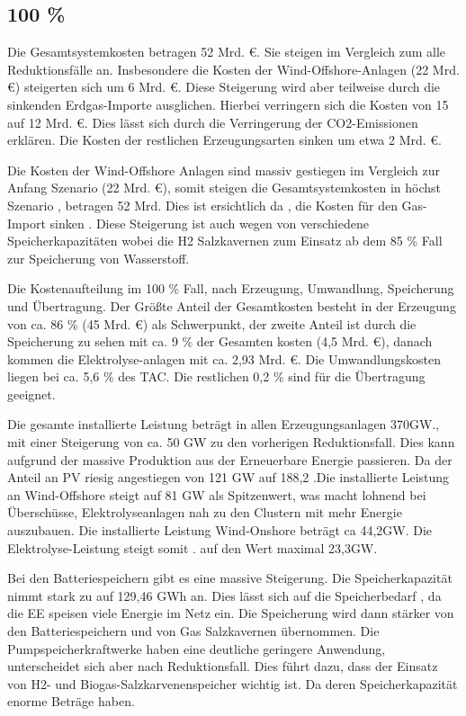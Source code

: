 \subsection{100 \%}
%
Die Gesamtsystemkosten betragen 52 Mrd. €. Sie steigen im Vergleich zum alle Reduktionsfälle an. Insbesondere die Kosten der Wind-Offshore-Anlagen (22 Mrd. €) steigerten sich um 6 Mrd. €. Diese Steigerung wird aber teilweise durch die sinkenden Erdgas-Importe ausglichen. Hierbei verringern sich die Kosten von 15 auf 12 Mrd. €. Dies lässt sich durch die Verringerung der CO2-Emissionen erklären. Die Kosten der restlichen Erzeugungsarten sinken um etwa 2 Mrd. €.

Die Kosten der Wind-Offshore Anlagen sind massiv gestiegen im Vergleich zur Anfang Szenario (22 Mrd. €), somit steigen die Gesamtsystemkosten in höchst Szenario , betragen 52 Mrd. Dies ist ersichtlich da , die Kosten für den Gas-Import sinken . Diese Steigerung  ist auch wegen von verschiedene Speicherkapazitäten wobei die H2 Salzkavernen zum Einsatz ab dem 85 \% Fall zur Speicherung von Wasserstoff.

Die Kostenaufteilung im 100 \% Fall, nach Erzeugung, Umwandlung, Speicherung und Übertragung. Der Größte Anteil der Gesamtkosten besteht in der Erzeugung von ca. 86 \% (45 Mrd. €) als Schwerpunkt, der zweite Anteil ist durch die Speicherung zu sehen mit ca. 9 \% der Gesamten kosten (4,5 Mrd. €), danach kommen die Elektrolyse-anlagen mit ca. 2,93 Mrd. €. Die Umwandlungskosten liegen bei ca. 5,6 \% des TAC. Die restlichen 0,2 \% sind für die Übertragung geeignet.

Die gesamte installierte Leistung beträgt in allen Erzeugungsanlagen 370GW., mit einer Steigerung von ca. 50 GW zu den vorherigen Reduktionsfall. Dies kann aufgrund der massive Produktion aus der Erneuerbare Energie passieren. Da der Anteil an PV riesig angestiegen von 121 GW auf 188,2 .Die installierte Leistung an Wind-Offshore steigt  auf 81 GW als Spitzenwert, was macht lohnend bei Überschüsse, Elektrolyseanlagen nah zu den Clustern mit mehr Energie auszubauen.  Die installierte Leistung Wind-Onshore beträgt ca 44,2GW. Die Elektrolyse-Leistung steigt somit . auf den Wert maximal  23,3GW.

Bei den Batteriespeichern gibt es eine massive Steigerung. Die Speicherkapazität nimmt stark zu auf  129,46 GWh an. Dies lässt sich auf die Speicherbedarf , da die EE speisen viele Energie im Netz ein. Die Speicherung  wird dann stärker von den Batteriespeichern und von Gas Salzkavernen übernommen. Die Pumpspeicherkraftwerke haben eine deutliche geringere  Anwendung, unterscheidet sich aber nach Reduktionsfall. Dies führt dazu, dass der Einsatz von  H2- und Biogas-Salzkarvenenspeicher wichtig ist. Da deren Speicherkapazität enorme Beträge haben.
